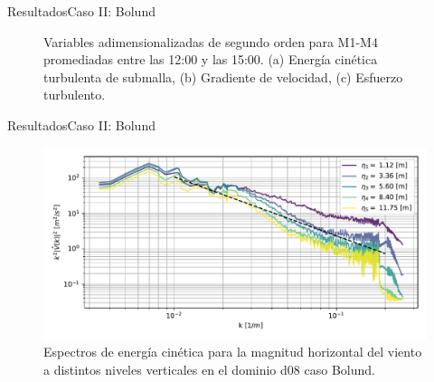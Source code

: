 \documentclass[mathserif,10pt]{beamer}
\begin{document}
\begin{frame}{Resultados}{Caso II: Bolund}
\begin{figure}[H]
\begin{center}
		\end{center}
		\vspace{-5mm}
		\caption{Variables adimensionalizadas de segundo orden para M1-M4 promediadas entre las 12:00 y las 15:00. (a) Energía cinética turbulenta de submalla, (b) Gradiente de velocidad, (c) Esfuerzo turbulento. }
		\label{fig:06_bol_mean_secondorder}
	\end{figure}
\end{frame}

\begin{frame}{Resultados}{Caso II: Bolund}
	\begin{figure}[H]
		\centering
		\hspace*{-5mm}\includegraphics[width=1.1\linewidth,page=1,trim={3mm 5mm -7mm 3mm},clip]{fig/06/bol/spectra}%
		\caption{Espectros de energía cinética para la magnitud horizontal del viento a distintos niveles verticales en el dominio d08 caso Bolund.}
		\label{fig:06_bol_spectrum}
	\end{figure}
\end{frame}
\end{document}
